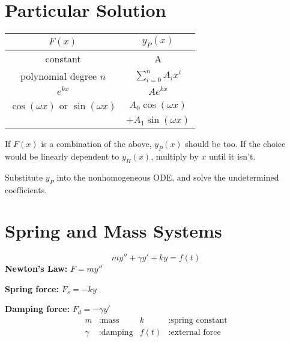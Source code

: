 \documentclass{article}
\begin{document}
\begin{multicols}{3}
    \section*{Particular Solution}
    \begin{table}[H]
        \centering
        \begin{tabular}{c c}
            \toprule
            \(F(x)\)                                                             & \(y_P(x)\)                               \\
            \midrule
            constant                                                           & A                                      \\
            polynomial degree \(n\)                                              & \(\displaystyle \sum_{i = 0}^n A_i x^i\) \\
            \(e^{kx}\)                                                          & \(A e^{kx}\)                            \\
            \(\cos{\left( \omega x \right)}\) or \(\sin{\left( \omega x \right)}\) & \(A_0 \cos{\left( \omega x \right)}\)    \\ & \(+ A_1 \sin{\left( \omega x \right)}\) \\
            \bottomrule
        \end{tabular}
    \end{table}
    If \(F(x)\) is a combination of the above, \(y_P(x)\) should be too.
    If the choice would be linearly dependent to \(y_H(x)\), multiply by \(x\) until it isn't.

    Substitute \(y_P\) into the nonhomogeneous ODE, and solve the undetermined coefficients.
    \section*{Spring and Mass Systems}
    \begin{equation*}
        m y'' + \gamma y' + k y = f(t)
    \end{equation*}
    \textbf{Newton's Law:} \(F = m y''\)

    \textbf{Spring force:} \(F_s = -k y\)

    \textbf{Damping force:} \(F_d = -\gamma y'\)
    \begin{align*}
        m      & : \text{mass}    & k    & : \text{spring constant} \\
        \gamma & : \text{damping} & f(t) & : \text{external force}
    \end{align*}

\end{multicols}
\end{document}
